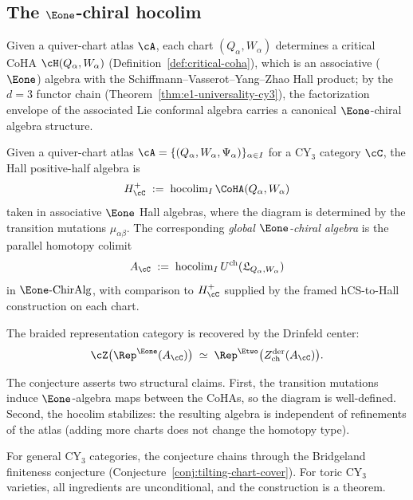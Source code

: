 \subsection{The \texorpdfstring{$\Eone$}{E1}-chiral hocolim}
\label{subsec:e1-hocolim}

Given a quiver-chart atlas $\cA$, each chart $(Q_\alpha, W_\alpha)$ determines a critical CoHA $\cH(Q_\alpha, W_\alpha)$ (Definition~\ref{def:critical-coha}), which is an associative ($\Eone$) algebra with the Schiffmann--Vasserot--Yang--Zhao Hall product; by the $d = 3$ functor chain (Theorem~\ref{thm:e1-universality-cy3}), the factorization envelope of the associated Lie conformal algebra carries a canonical $\Eone$-chiral algebra structure.

\begin{conjecture}
\label{conj:e1-chart-gluing}
\ClaimStatusConjectured
Given a quiver-chart atlas $\cA = \{(Q_\alpha, W_\alpha, \Psi_\alpha)\}_{\alpha \in I}$ for a CY$_3$ category $\cC$, the Hall positive-half algebra is
\begin{equation}
\label{eq:global-hall-positive-half}
 H^+_\cC \;:=\; \operatorname{hocolim}_{I} \CoHA(Q_\alpha, W_\alpha)
\end{equation}
taken in associative $\Eone$ Hall algebras, where the diagram is determined by the transition mutations $\mu_{\alpha\beta}$. The corresponding \emph{global $\Eone$-chiral algebra} is the parallel homotopy colimit
\begin{equation}
\label{eq:global-e1-chiral}
 A_\cC \;:=\; \operatorname{hocolim}_{I} U^{\mathrm{ch}}(\mathfrak L_{Q_\alpha,W_\alpha})
\end{equation}
in $\Eone\text{-}\mathrm{ChirAlg}$, with comparison to $H^+_\cC$ supplied by the framed hCS-to-Hall construction on each chart.

The braided representation category is recovered by the Drinfeld center:
\[
 \cZ\bigl(\Rep^{\Eone}(A_\cC)\bigr)
 \;\simeq\;
 \Rep^{\Etwo}\bigl(Z^{\mathrm{der}}_{\mathrm{ch}}(A_\cC)\bigr).
\]
\end{conjecture}

The conjecture asserts two structural claims. First, the transition mutations induce $\Eone$-algebra maps between the CoHAs, so the diagram is well-defined. Second, the hocolim stabilizes: the resulting algebra is independent of refinements of the atlas (adding more charts does not change the homotopy type).

For general CY$_3$ categories, the conjecture chains through the Bridgeland finiteness conjecture (Conjecture~\ref{conj:tilting-chart-cover}). For toric CY$_3$ varieties, all ingredients are unconditional, and the construction is a theorem.

